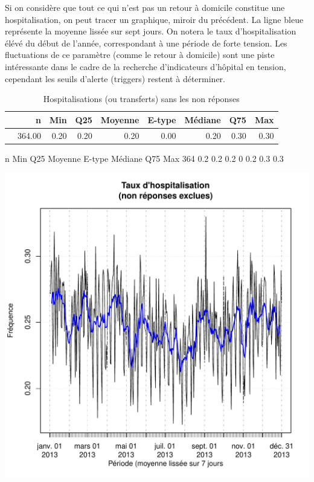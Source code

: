 \documentclass[12pt,english,french,twoside]{book}\usepackage[]{graphicx}\usepackage[]{color}
\makeatletter
\def\maxwidth{ %
  \ifdim\Gin@nat@width>\linewidth
    \linewidth
  \else
    \Gin@nat@width
  \fi
}
\makeatother
\begin{document}
Si on considère que tout ce qui n'est pas un retour à domicile constitue une hospitalisation, on peut tracer un graphique, miroir du précédent. La ligne bleue représente la moyenne lissée sur sept jours. On notera le taux d'hospitalisation élévé du début de l'année, correspondant à une période de forte tension. Les fluctuations de ce paramètre (comme le retour à domicile) sont une piste intéressante dans le cadre de la recherche d'indicateurs d'hôpital en tension, cependant les seuils d'alerte (triggers) restent à déterminer.

\begin{table}[ht]
\centering
\begin{tabular}{rrrrrrrrr}
  \hline
 & n & Min & Q25 & Moyenne & E-type & Médiane & Q75 & Max \\ 
  \hline
 & 364.00 & 0.20 & 0.20 & 0.20 & 0.00 & 0.20 & 0.30 & 0.30 \\ 
   \hline
\end{tabular}
\caption[Hospitalisations]{Hospitalisations (ou transferts) sans les non réponses} 
\label{tab:hosp}
\end{table}
   n Min Q25 Moyenne E-type Médiane Q75 Max
 364 0.2 0.2     0.2      0     0.2 0.3 0.3

\includegraphics[width=\maxwidth]{figure/hospit} 
\end{document}

